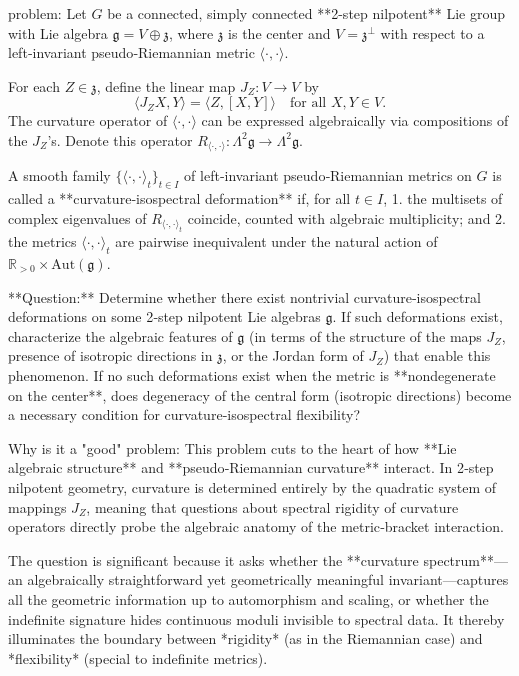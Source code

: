problem:  
Let \( G \) be a connected, simply connected **2-step nilpotent** Lie group with Lie algebra \( \mathfrak{g} = V \oplus \mathfrak{z} \), where \( \mathfrak{z} \) is the center and \( V = \mathfrak{z}^\perp \) with respect to a left‑invariant pseudo‑Riemannian metric \( \langle \cdot , \cdot \rangle \).  

For each \( Z \in \mathfrak{z} \), define the linear map \( J_Z : V \to V \) by  
\[
\langle J_Z X, Y \rangle = \langle Z, [X,Y] \rangle \quad \text{for all } X,Y \in V.
\]
The curvature operator of \( \langle \cdot , \cdot \rangle \) can be expressed algebraically via compositions of the \(J_Z\)’s. Denote this operator \( R_{\langle \cdot , \cdot \rangle} : \Lambda^2 \mathfrak{g} \to \Lambda^2 \mathfrak{g} \).

A smooth family \( \{ \langle \cdot , \cdot \rangle_t \}_{t \in I} \) of left‑invariant pseudo‑Riemannian metrics on \( G \) is called a **curvature‑isospectral deformation** if, for all \( t \in I \),
1. the multisets of complex eigenvalues of \(R_{\langle \cdot , \cdot \rangle_t}\) coincide, counted with algebraic multiplicity; and  
2. the metrics \( \langle \cdot , \cdot \rangle_t \) are pairwise inequivalent under the natural action of \( \mathbb{R}_{>0} \times \mathrm{Aut}(\mathfrak{g}) \).

**Question:**  
Determine whether there exist nontrivial curvature‑isospectral deformations on some 2‑step nilpotent Lie algebras \( \mathfrak{g} \).  
If such deformations exist, characterize the algebraic features of \( \mathfrak{g} \) (in terms of the structure of the maps \( J_Z \), presence of isotropic directions in \( \mathfrak{z} \), or the Jordan form of \( J_Z \)) that enable this phenomenon.  
If no such deformations exist when the metric is **nondegenerate on the center**, does degeneracy of the central form (isotropic directions) become a necessary condition for curvature‑isospectral flexibility?

Why is it a "good" problem:  
This problem cuts to the heart of how **Lie algebraic structure** and **pseudo‑Riemannian curvature** interact. In 2‑step nilpotent geometry, curvature is determined entirely by the quadratic system of mappings \( J_Z \), meaning that questions about spectral rigidity of curvature operators directly probe the algebraic anatomy of the metric‑bracket interaction.  

The question is significant because it asks whether the **curvature spectrum**—an algebraically straightforward yet geometrically meaningful invariant—captures all the geometric information up to automorphism and scaling, or whether the indefinite signature hides continuous moduli invisible to spectral data. It thereby illuminates the boundary between *rigidity* (as in the Riemannian case) and *flexibility* (special to indefinite metrics).  

